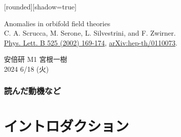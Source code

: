 \documentclass[
  unicode,a4paper,9pt,
  xcolor = {dvipsnames,svgnames},
  hyperref ={colorlinks=true,citecolor=Navy,linkcolor=NavyBlue,urlcolor=purple},
  ja=standard,lualatex
]{beamer}
\begin{document}
\nocite{Scrucca:2001eb}

\begin{frame}

  [rounded][shadow=true]
  \begin{block}{}
    \vspace*{5pt}

    \centering\Large
    Anomalies in orbifold field theories
    \\
    \normalsize
    C. A. Scrucca, M. Serone, L. Silvestrini, and F. Zwirner.
    \\
    \small
    \href{https://doi.org/10.1016/S0370-2693(01)01430-7}{Phys. Lett. B 525 (2002) 169-174},
    \href{https://doi.org/10.48550/arXiv.hep-th/0110073}{arXiv:hep-th/0110073}.    

    \vspace*{5pt}
  \end{block}

  \begin{center}
    安倍研 M1 宮根一樹\\
    2024 6/18 (火)
  \end{center}

\end{frame}


\begin{frame}
  \frametitle{読んだ動機など}
  
  \cite{Peskin:1995}
  
\end{frame}


\section{イントロダクション}

\begin{frame}[plain]
  \huge \secname
\end{frame}

\begin{frame}



  

\end{frame}
\end{document}
